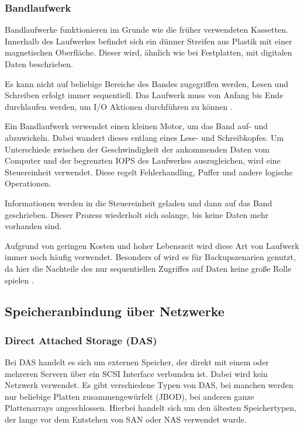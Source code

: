 \subsubsection{Bandlaufwerk}

Bandlaufwerke funktionieren im Grunde wie die früher verwendeten Kassetten. Innerhalb des Laufwerkes befindet sich ein dünner Streifen aus Plastik mit einer magnetischen Oberfläche. Dieser wird, ähnlich wie bei Festplatten, mit digitalen Daten beschrieben. 

Es kann nicht auf beliebige Bereiche des Bandes zugegriffen werden, Lesen und Schreiben erfolgt immer sequentiell. Das Laufwerk muss von Anfang bis Ende durchlaufen werden, um I/O Aktionen durchführen zu können \parencite{adrc.2009}.

Ein Bandlaufwerk verwendet einen kleinen Motor, um das Band auf- und abzuwickeln. Dabei wandert dieses entlang eines Lese- und Schreibkopfes. Um Unterschiede zwischen der Geschwindigkeit der ankommenden Daten vom Computer und der begrenzten \gls{IOPS} des Laufwerkes auszugleichen, wird eine Steuereinheit verwendet. Diese regelt Fehlerhandling, Puffer und andere logische Operationen.

Informationen werden in die Steuereinheit geladen und dann auf das Band geschrieben. Dieser Prozess wiederholt sich solange, bis keine Daten mehr vorhanden sind.

Aufgrund von geringen Kosten und hoher Lebenszeit wird diese Art von Laufwerk immer noch häufig verwendet. Besonders of wird es für Backupszenarien genutzt, da hier die Nachteile des nur sequentiellen Zugriffes auf Daten keine große Rolle spielen \parencite{adrc.2009}. 

\subsection{Speicheranbindung über Netzwerke}
\subsubsection{Direct Attached Storage (DAS)}

Bei \ac{DAS} handelt es sich um externen Speicher, der direkt mit einem oder mehreren Servern über ein \gls{SCSI} Interface verbunden ist. Dabei wird kein Netzwerk verwendet. Es gibt verschiedene Typen von \ac{DAS}, bei manchen werden nur beliebige Platten zusammengewürfelt (\ac{JBOD}), bei anderen ganze Plattenarrays angeschlossen.
Hierbei handelt sich um den ältesten Speichertypen, der lange vor dem Entstehen von SAN oder NAS verwendet wurde.

